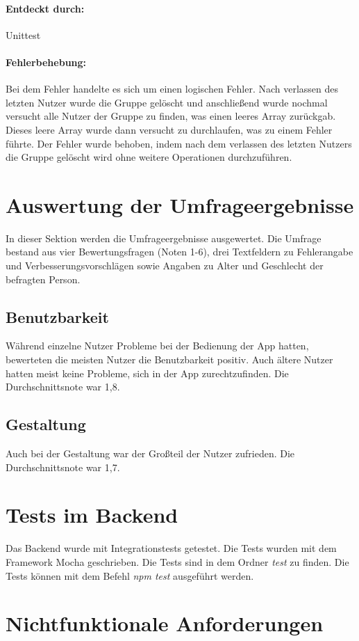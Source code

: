 \documentclass{qualitätssicherungsheft}
\begin{document}
\paragraph*{Entdeckt durch:} Unittest
\paragraph*{Fehlerbehebung:} Bei dem Fehler handelte es sich um einen logischen Fehler. Nach verlassen des letzten Nutzer wurde die Gruppe gelöscht und anschließend wurde nochmal versucht alle Nutzer der Gruppe zu finden, was einen leeres Array zurückgab. Dieses leere Array wurde dann versucht zu durchlaufen, was zu einem Fehler führte. Der Fehler wurde behoben, indem nach dem verlassen des letzten Nutzers die Gruppe gelöscht wird ohne weitere Operationen durchzuführen.

\section{Auswertung der Umfrageergebnisse}
In dieser Sektion werden die Umfrageergebnisse ausgewertet. Die Umfrage bestand aus vier Bewertungsfragen (Noten 1-6), drei Textfeldern zu Fehlerangabe und Verbesserungsvorschlägen sowie Angaben zu Alter und Geschlecht der befragten Person.

\subsection{Benutzbarkeit}
Während einzelne Nutzer Probleme bei der Bedienung der App hatten, bewerteten die meisten Nutzer die Benutzbarkeit positiv. Auch ältere Nutzer hatten meist keine Probleme, sich in der App zurechtzufinden. Die Durchschnittsnote war 1,8.

\subsection{Gestaltung}
Auch bei der Gestaltung war der Großteil der Nutzer zufrieden. Die Durchschnittsnote war 1,7.

\section{Tests im Backend}
Das Backend wurde mit Integrationstests getestet. Die Tests wurden mit dem Framework Mocha geschrieben. 
Die Tests sind in dem Ordner \textit{test} zu finden. Die Tests können mit dem Befehl \textit{npm test} ausgeführt werden.

\section{Nichtfunktionale Anforderungen}
\end{document}
